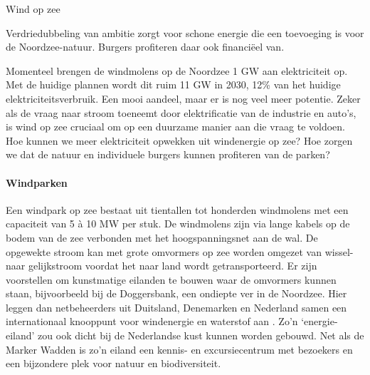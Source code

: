 \begin{voorstel}{Wind op zee}


\begin{samenvatting}
Verdriedubbeling van ambitie zorgt voor schone energie die een toevoeging is voor de Noordzee-natuur. Burgers profiteren daar ook financiëel van.
\end{samenvatting}

\begin{multicols}{2}

\begin{uitdaging}
Momenteel brengen de windmolens op de Noordzee 1 GW aan elektriciteit op. Met de huidige plannen wordt dit ruim 11 GW in 2030, 12\% van het huidige elektriciteitsverbruik. Een mooi aandeel, maar er is nog veel meer potentie. Zeker als de vraag naar stroom toeneemt door elektrificatie van de industrie en auto’s, is wind op zee cruciaal om op een duurzame manier aan die vraag te voldoen. Hoe kunnen we meer elektriciteit opwekken uit windenergie op zee? Hoe zorgen we dat de natuur en individuele burgers kunnen profiteren van de parken?
\end{uitdaging}

\begin{overwegingen}
\paragraph{Windparken}
Een windpark op zee bestaat uit tientallen tot honderden windmolens met een capaciteit van 5 à 10 MW per stuk. De windmolens zijn via lange kabels op de bodem van de zee verbonden met het hoogspanningsnet aan de wal. De opgewekte stroom kan met grote omvormers op zee worden omgezet van wissel- naar gelijkstroom voordat het naar land wordt getransporteerd. Er zijn voorstellen om kunstmatige eilanden te bouwen waar de omvormers kunnen staan, bijvoorbeeld bij de Doggersbank, een ondiepte ver in de Noordzee. Hier leggen dan netbeheerders uit Duitsland, Denemarken en Nederland samen een internationaal knooppunt voor windenergie en waterstof aan \parencite{north_sea_wind_power_hub_north_2019}. Zo’n `energie-eiland' zou ook dicht bij de Nederlandse kust kunnen worden gebouwd. Net als de Marker Wadden is zo’n eiland een kennis- en excursiecentrum met bezoekers en een bijzondere plek voor natuur en biodiversiteit.


\end{overwegingen}
\end{multicols}
\end{voorstel}
